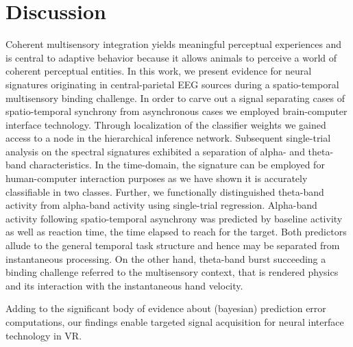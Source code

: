\section{Discussion}%


Coherent multisensory integration yields meaningful perceptual experiences and is central to adaptive behavior because it allows animals to perceive a world of coherent perceptual entities. In this work, we present evidence for neural signatures originating in central-parietal EEG sources during a spatio-temporal multisensory binding challenge. In order to carve out a signal separating cases of spatio-temporal synchrony from asynchronous cases we employed brain-computer interface technology. Through localization of the classifier weights we gained access to a node in the hierarchical inference network. Subsequent single-trial analysis on the spectral signatures exhibited a separation of alpha- and theta-band characteristics. In the time-domain, the signature can be employed for human-computer interaction purposes as we have shown it is accurately classifiable in two classes. Further, we functionally distinguished theta-band activity from alpha-band activity using single-trial regression. Alpha-band activity following spatio-temporal asynchrony was predicted by baseline activity as well as reaction time, the time elapsed to reach for the target. Both predictors allude to the general temporal task structure and hence may be separated from instantaneous processing. On the other hand, theta-band burst succeeding a binding challenge referred to the multisensory context, that is rendered physics and its interaction with the instantaneous hand velocity.


Adding to the significant body of evidence about (bayesian) prediction error computations, our findings enable targeted signal acquisition for neural interface technology in VR. 



